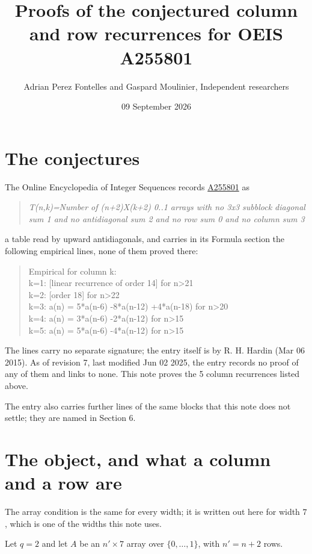 \documentclass[11pt]{article}
\title{Proofs of the conjectured column and row recurrences for OEIS A255801}
\author{Adrian Perez Fontelles and Gaspard Moulinier, Independent researchers}
\date{09 September 2026}
\theoremstyle{definition}
\begin{document}
\maketitle
\section{The conjectures}

The Online Encyclopedia of Integer Sequences records \href{https://oeis.org/A255801}{A255801} as

\begin{quote}\itshape T(n,k)=Number of (n+2)X(k+2) 0..1 arrays with no 3x3 subblock diagonal sum 1 and no antidiagonal sum 2 and no row sum 0 and no column sum 3\end{quote}

a table read by upward antidiagonals, and carries in its Formula section the following empirical lines, none of them proved there:

\begin{quote}\ttfamily Empirical for column k:\\
k=1: [linear recurrence of order 14] for n>21\\k=2: [order 18] for n>22\\k=3: a(n) = 5*a(n-6) -8*a(n-12) +4*a(n-18) for n>20\\k=4: a(n) = 3*a(n-6) -2*a(n-12) for n>15\\k=5: a(n) = 5*a(n-6) -4*a(n-12) for n>15\end{quote}

The lines carry no separate signature; the entry itself is by R. H. Hardin (Mar 06 2015). As of revision 7, last modified Jun 02 2025, the entry records no proof of any of them and links to none. This note proves the 5 column recurrences listed above.

The entry also carries further lines of the same blocks that this note does not settle; they are named in Section 6.

\section{The object, and what a column and a row are}

The array condition is the same for every width; it is written out here for width $7$, which is one of the widths this note uses.

Let $q = 2$ and let $A$ be an $n' \times 7$ array over $\{0,\dots,1\}$, with $n' = n + 2$ rows.
\end{document}
